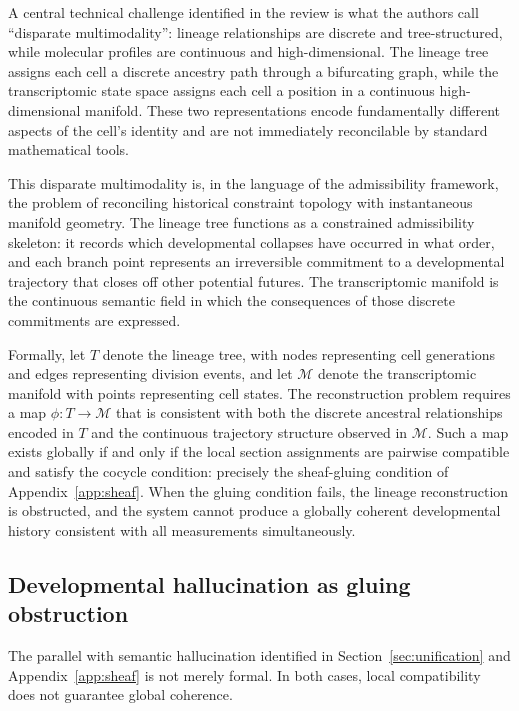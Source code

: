 \documentclass[12pt, a4paper]{article}
\theoremstyle{plain}
\theoremstyle{definition}
\theoremstyle{remark}
\begin{document}
A central technical challenge identified in the review is what the authors
call ``disparate multimodality'': lineage relationships are discrete and
tree-structured, while molecular profiles are continuous and
high-dimensional.
The lineage tree assigns each cell a discrete ancestry path through a
bifurcating graph, while the transcriptomic state space assigns each cell
a position in a continuous high-dimensional manifold.
These two representations encode fundamentally different aspects of the
cell's identity and are not immediately reconcilable by standard
mathematical tools.

This disparate multimodality is, in the language of the admissibility
framework, the problem of reconciling historical constraint topology with
instantaneous manifold geometry.
The lineage tree functions as a constrained admissibility skeleton: it
records which developmental collapses have occurred in what order, and
each branch point represents an irreversible commitment to a developmental
trajectory that closes off other potential futures.
The transcriptomic manifold is the continuous semantic field in which the
consequences of those discrete commitments are expressed.

Formally, let $T$ denote the lineage tree, with nodes representing cell
generations and edges representing division events, and let
$\mathcal{M}$ denote the transcriptomic manifold with points representing
cell states.
The reconstruction problem requires a map $\phi : T \to \mathcal{M}$ that
is consistent with both the discrete ancestral relationships encoded in $T$
and the continuous trajectory structure observed in $\mathcal{M}$.
Such a map exists globally if and only if the local section assignments
are pairwise compatible and satisfy the cocycle condition: precisely the
sheaf-gluing condition of Appendix~\ref{app:sheaf}.
When the gluing condition fails, the lineage reconstruction is obstructed,
and the system cannot produce a globally coherent developmental history
consistent with all measurements simultaneously.

\subsection{Developmental hallucination as gluing obstruction}

The parallel with semantic hallucination identified in Section~\ref{sec:unification}
and Appendix~\ref{app:sheaf} is not merely formal.
In both cases, local compatibility does not guarantee global coherence.
\end{document}
